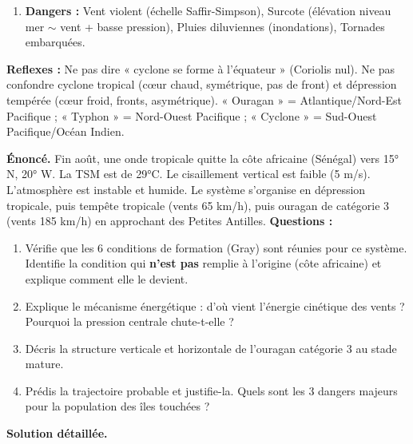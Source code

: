 \documentclass[11pt]{article}
\newcommand{\cle}[1]{{\popxbold\color{popdark}#1}}
\begin{document}
\begin{methode}
\begin{enumerate}
    \item \textbf{Dangers :} Vent violent (échelle Saffir-Simpson), \cle{Surcote} (élévation niveau mer $\sim$ vent + basse pression), Pluies diluviennes (inondations), Tornades embarquées.
\end{enumerate}
\textbf{Reflexes :} Ne pas dire « cyclone se forme à l'équateur » (Coriolis nul). Ne pas confondre cyclone tropical (cœur chaud, symétrique, pas de front) et dépression tempérée (cœur froid, fronts, asymétrique). « Ouragan » = Atlantique/Nord-Est Pacifique ; « Typhon » = Nord-Ouest Pacifique ; « Cyclone » = Sud-Ouest Pacifique/Océan Indien.
\end{methode}

\begin{exoresolu}
\textbf{Énoncé.} Fin août, une onde tropicale quitte la côte africaine (Sénégal) vers 15° N, 20° W. La TSM est de 29°C. Le cisaillement vertical est faible (5 m/s). L'atmosphère est instable et humide. Le système s'organise en dépression tropicale, puis tempête tropicale (vents 65 km/h), puis ouragan de catégorie 3 (vents 185 km/h) en approchant des Petites Antilles.
\textbf{Questions :}
\begin{enumerate}
    \item Vérifie que les 6 conditions de formation (Gray) sont réunies pour ce système. Identifie la condition qui \textbf{n'est pas} remplie à l'origine (côte africaine) et explique comment elle le devient.
    \item Explique le mécanisme énergétique : d'où vient l'énergie cinétique des vents ? Pourquoi la pression centrale chute-t-elle ?
    \item Décris la structure verticale et horizontale de l'ouragan catégorie 3 au stade mature.
    \item Prédis la trajectoire probable et justifie-la. Quels sont les 3 dangers majeurs pour la population des îles touchées ?
\end{enumerate}

\tcblower
\textbf{Solution détaillée.}


\end{exoresolu}
\end{document}
